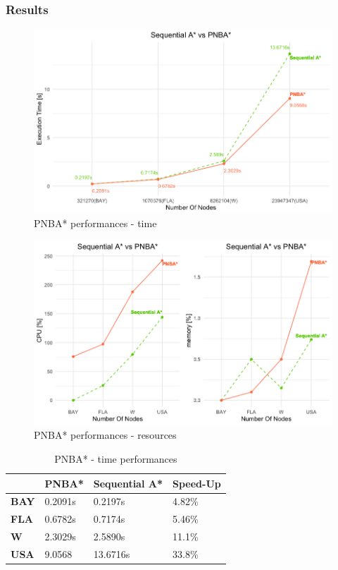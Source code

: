 \documentclass[twocolumn, switch]{article} %
\begin{document}
\subsubsection{Results}
\begin{figure}[ht!]
  \centering
  \includegraphics[width=1\linewidth]{pnba/pnba_time.png}
  \caption{PNBA* performances - time}
  \label{pnbatime}
\end{figure}
\begin{figure}[ht!]
  \centering
  \includegraphics[width=1\linewidth]{pnba/pnba_cpumem.png}
  \caption{PNBA* performances - resources}
  \label{pnbacpumem}
\end{figure}
\begin{table}[ht!]
  \centering
  \caption{PNBA* - time performances}
  \begin{tabular}{|l|l|l|l|}
  \hline
  \textbf{}    & \textbf{PNBA*} & \textbf{Sequential A*} & \textbf{Speed-Up} \\ \hline
  \textbf{BAY} & 0.2091s        & 0.2197s                & 4.82\%            \\ \hline
  \textbf{FLA} & 0.6782s        & 0.7174s                & 5.46\%            \\ \hline
  \textbf{W}   & 2.3029s        & 2.5890s                & 11.1\%            \\ \hline
  \textbf{USA} & 9.0568         & 13.6716s               & 33.8\%            \\ \hline
  \end{tabular}
\end{table}
\end{document}
